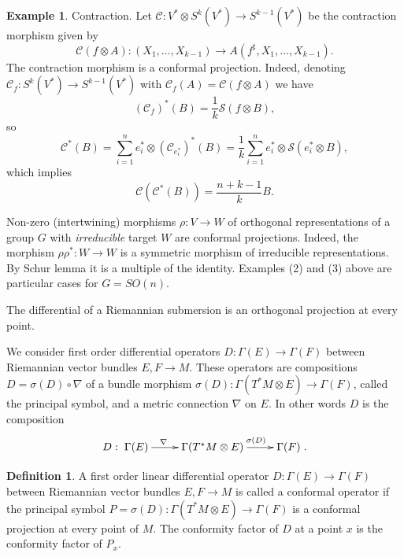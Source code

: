 \documentclass[12pt]{amsart} %
\theoremstyle{definition}
\newtheorem{definition}[theorem]{Definition}
\newtheorem{example}[theorem]{Example}
\numberwithin{equation}{section}
\newcommand{\ra}{\rightarrow}
\begin{document}
\begin{example}
\item[(5)] Contraction. Let $\mathcal{C}:V^*\otimes S^k(V^ *)\ra S^{k-1}(V^ *)$ be the contraction morphism given by
$$\mathcal{C}(f \otimes A):(X_1,\ldots,X_{k-1}) \ra A(f^ {\sharp},X_1,\ldots,X_{k-1}) .$$
The contraction morphism is a conformal projection. Indeed, denoting $\mathcal{C}_f:S^k(V^ *)\ra S^{k-1}(V^ *)$ with  $\mathcal{C}_f(A)= \mathcal{C}(f\otimes A)$ we have
\[(\mathcal{C}_f)^ *(B)=\frac{1}{k}\mathcal{S}(f\otimes B),\]
so
\[\mathcal{C}^ *(B)=\sum_{i=1}^ ne_i^ *\otimes (\mathcal{C}_{e_i^ *})^ *(B)=\frac{1}{k}\sum_{i=1}^ne_i^ * \otimes \mathcal{S}(e_i^ *\otimes B),\]
which implies
\[\mathcal{C}(\mathcal{C}^ *(B))=\frac{n+k-1}{k}B.\]

\item[(6)] Non-zero (intertwining) morphisms $\rho:V\ra W$ of orthogonal representations of a group $G$ with \emph{irreducible} target $W$ are conformal projections. Indeed, the morphism $\rho\rho^ *:W\ra W$ is a symmetric morphism of irreducible representations. By Schur lemma it is a multiple of the identity. Examples (2) and (3) above are particular cases for $G=SO(n)$.

\item[(7)] The differential of a Riemannian submersion is an orthogonal projection at every point.
\end{example}

We consider first order differential operators $D:\Gamma(E)\ra \Gamma(F)$ between Riemannian vector bundles $E,F\ra M$. These operators are compositions $D=\sigma(D) \circ \nabla$ of a bundle morphism $\sigma(D): \Gamma (T^ *M\otimes E) \ra \Gamma (F)$, called the principal symbol, and a metric connection $\nabla$ on $E$. In other words $D$ is the composition
\[D: \xymatrix{\Gamma(E)\ar[r]^ {\nabla\qquad} & \Gamma(T^ *M\otimes E) \ar[r]^ {\quad\sigma(D)} & \Gamma(F)}.\]

\begin{definition}\label{confoperator} A first order linear differential operator $D:\Gamma(E)\ra \Gamma(F)$ between Riemannian vector bundles $E,F\ra M$ is called a conformal operator if the principal symbol $P=\sigma(D): \Gamma (T^ *M\otimes E) \ra \Gamma (F)$ is a conformal projection at every point of $M$. The conformity factor of $D$ at a point $x$ is the conformity factor of $P_x$.
\end{definition}
\end{document}
